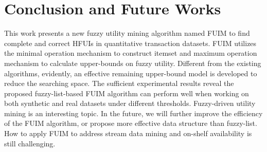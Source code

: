 \documentclass[journal]{IEEEtran}
\begin{document}
\section{Conclusion and Future Works}
\label{sec:conclusion}

This work presents a new fuzzy utility mining algorithm named FUIM to find complete and correct HFUIs in quantitative transaction datasets. FUIM utilizes the minimal operation mechanism to construct itemset and maximum operation mechanism to calculate upper-bounds on fuzzy utility. Different from the existing algorithms, evidently, an effective remaining upper-bound model is developed to reduce the searching space. The sufficient experimental results reveal the proposed fuzzy-list-based FUIM algorithm can perform well when working on both synthetic and real datasets under different thresholds. Fuzzy-driven utility mining is an interesting topic. In the future, we will further improve the efficiency of the FUIM algorithm, or propose more effective data structure than fuzzy-list. How to apply FUIM to address stream data mining  and on-shelf availability is still challenging.



\ifCLASSOPTIONcaptionsoff
  \newpage
\fi












\end{document}
